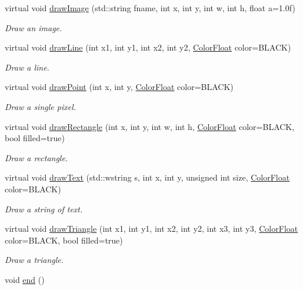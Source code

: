 \begin{DoxyCompactItemize}
virtual void \hyperlink{class_canvas_a9c9f7c76fa582510c9fd6bac55d013ab}{draw\+Image} (std\+::string fname, int x, int y, int w, int h, float a=1.\+0f)
\begin{DoxyCompactList}\small\item\em Draw an image. \end{DoxyCompactList}\item 
virtual void \hyperlink{class_canvas_a7a017b3bcb4f983b7ea106dea1d1a4f2}{draw\+Line} (int x1, int y1, int x2, int y2, \hyperlink{struct_color_float}{Color\+Float} color=B\+L\+A\+C\+K)
\begin{DoxyCompactList}\small\item\em Draw a line. \end{DoxyCompactList}\item 
virtual void \hyperlink{class_canvas_a6a4cd6d80f90f79e4438deb47b432d74}{draw\+Point} (int x, int y, \hyperlink{struct_color_float}{Color\+Float} color=B\+L\+A\+C\+K)
\begin{DoxyCompactList}\small\item\em Draw a single pixel. \end{DoxyCompactList}\item 
virtual void \hyperlink{class_canvas_a33bb124b99c7621514b2b5220dd0bbc3}{draw\+Rectangle} (int x, int y, int w, int h, \hyperlink{struct_color_float}{Color\+Float} color=B\+L\+A\+C\+K, bool filled=true)
\begin{DoxyCompactList}\small\item\em Draw a rectangle. \end{DoxyCompactList}\item 
virtual void \hyperlink{class_canvas_a751a2e449ec3803934143d5e7cc5cd0a}{draw\+Text} (std\+::wstring s, int x, int y, unsigned int size, \hyperlink{struct_color_float}{Color\+Float} color=B\+L\+A\+C\+K)
\begin{DoxyCompactList}\small\item\em Draw a string of text. \end{DoxyCompactList}\item 
virtual void \hyperlink{class_canvas_a009d8fcfde43d6967cce737778f9e51d}{draw\+Triangle} (int x1, int y1, int x2, int y2, int x3, int y3, \hyperlink{struct_color_float}{Color\+Float} color=B\+L\+A\+C\+K, bool filled=true)
\begin{DoxyCompactList}\small\item\em Draw a triangle. \end{DoxyCompactList}\item 
void \hyperlink{class_canvas_a5118913e1b6d376171b8856ca2f4b508}{end} ()

\end{DoxyCompactItemize}
